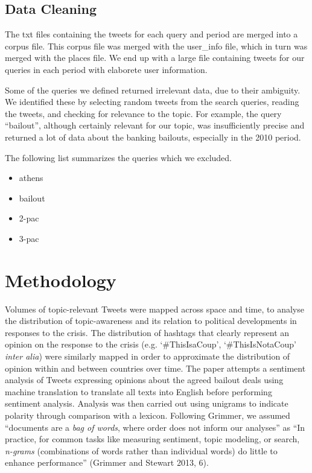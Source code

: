 \documentclass[]{article}
\begin{document}
\subsection{Data Cleaning}\label{data-cleaning}

The txt files containing the tweets for each query and period are merged
into a corpus file. This corpus file was merged with the user\_info
file, which in turn was merged with the places file. We end up with a
large file containing tweets for our queries in each period with
elaborete user information.

Some of the queries we defined returned irrelevant data, due to their
ambiguity. We identified these by selecting random tweets from the
search queries, reading the tweets, and checking for relevance to the
topic. For example, the query ``bailout'', although certainly relevant
for our topic, was insufficiently precise and returned a lot of data
about the banking bailouts, especially in the 2010 period.

The following list summarizes the queries which we excluded.

\begin{itemize}
\itemsep1pt\parskip0pt
\item
  athens
\item
  bailout
\item
  2-pac
\item
  3-pac
\end{itemize}

\section{Methodology}\label{methodology}

Volumes of topic-relevant Tweets were mapped across space and time, to
analyse the distribution of topic-awareness and its relation to
political developments in responses to the crisis. The distribution of
hashtags that clearly represent an opinion on the response to the crisis
(e.g. `\#ThisIsaCoup', `\#ThisIsNotaCoup' \emph{inter alia}) were
similarly mapped in order to approximate the distribution of opinion
within and between countries over time. The paper attempts a sentiment
analysis of Tweets expressing opinions about the agreed bailout deals
using machine translation to translate all texts into English before
performing sentiment analysis. Analysis was then carried out using
unigrams to indicate polarity through comparison with a lexicon.
Following Grimmer, we assumed ``documents are a \emph{bag of words},
where order does not inform our analyses'' as ``In practice, for common
tasks like measuring sentiment, topic modeling, or search,
\emph{n-grams} (combinations of words rather than individual words) do
little to enhance performance'' (Grimmer and Stewart 2013, 6).
\end{document}
